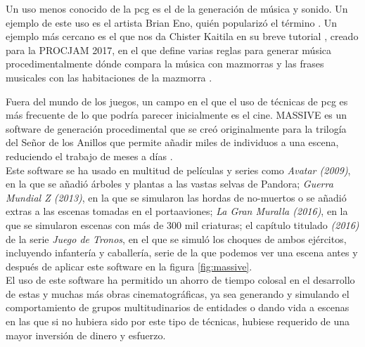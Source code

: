 Un uso menos conocido de la \acrshort{pcg} es el de la generación de música y sonido. Un ejemplo de este uso es el artista Brian Eno, quién popularizó el término  \cite{eno1996}. Un ejemplo más cercano es el que nos da Chister Kaitila en su breve tutorial , creado para la PROCJAM 2017, en el que define varias reglas para generar música procedimentalmente dónde compara la música con mazmorras y las frases musicales con las habitaciones de la mazmorra \cite{kaitila2017}.

\newpage
Fuera del mundo de los juegos, un campo en el que el uso de técnicas de \acrshort{pcg} es más frecuente de lo que podría parecer inicialmente es el cine. MASSIVE \cite{massive} es un software de generación procedimental que se creó originalmente para la trilogía del Señor de los Anillos que permite añadir miles de individuos a una escena, reduciendo el trabajo de meses a días \cite{collins2017}.\\

Este software se ha usado en multitud de películas y series como \textit{Avatar (2009)}, en la que se añadió árboles y plantas a las vastas selvas de Pandora; \textit{Guerra Mundial Z (2013)}, en la que se simularon las hordas de no-muertos o se añadió extras a las escenas tomadas en el portaaviones; \textit{La Gran Muralla (2016)}, en la que se simularon escenas con más de 300 mil criaturas; el capítulo titulado \textit{ (2016)} de la serie \textit{Juego de Tronos}, en el que se simuló los choques de ambos ejércitos, incluyendo infantería y caballería, serie de la que podemos ver una escena antes y después de aplicar este software en la figura \ref{fig:massive}.\\

El uso de este software ha permitido un ahorro de tiempo colosal en el desarrollo de estas y muchas más obras cinematográficas, ya sea generando y simulando el comportamiento de grupos multitudinarios de entidades o dando vida a escenas en las que si no hubiera sido por este tipo de técnicas, hubiese requerido de una mayor inversión de dinero y esfuerzo.\\

